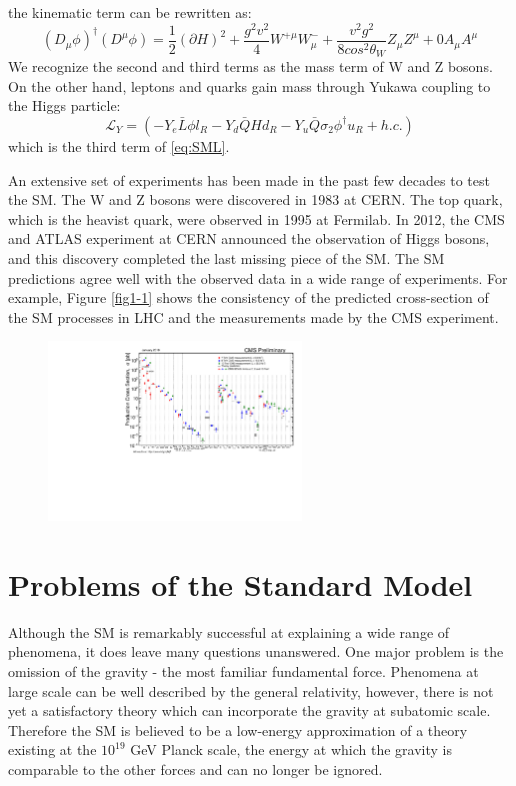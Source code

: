 \documentclass[thesis.tex]{subfiles}
\begin{document}
the kinematic term can be rewritten as:
	\begin{equation}
		(D_\mu \phi)^\dagger(D^\mu\phi) = \frac{1}{2}(\partial H)^2 + \frac{g^2v^2}{4}W^{+\mu}W_{\mu}^- + \frac{v^2g^2}{8cos^2\theta_W}Z_\mu Z^\mu + 0A_\mu A^\mu
	\end{equation}
We recognize the second and third terms as the mass term of W and Z bosons. On the other hand, leptons and quarks gain mass through Yukawa coupling to the Higgs particle:
	\begin{equation}
		\mathcal{L}_Y = (- Y_e \bar{L} \phi l_R - Y_d \bar{Q}H d_R - Y_u \bar{Q} \sigma_2 \phi^\dagger u_R + h.c.)
	\end{equation}
which is the third term of  \ref{eq:SML}. 


An extensive set of experiments has been made in the past few decades to test the SM. 
The W and Z bosons were discovered in 1983 at CERN. The top quark, which is the heavist quark, were observed in 1995 at Fermilab. 
In 2012, the CMS and ATLAS experiment at CERN announced the observation of Higgs bosons, and this discovery completed the last missing piece of the SM.  
The SM predictions agree well with the observed data in a wide range of experiments. 
For example, Figure \ref{fig1-1} shows the consistency of the predicted cross-section of the SM processes in LHC and the measurements made by the CMS experiment.
	\begin{figure}[hbtp]
		\centering
	\includegraphics[width=0.6\textwidth]{plot/SigmaNew_v0.pdf}
	\end{figure}
	

\section{Problems of the Standard Model}
Although the SM is remarkably successful at explaining a wide range of phenomena, it does leave many questions unanswered. 
One major problem is the omission of the gravity - the most familiar fundamental force. 
Phenomena at large scale can be well described by the general relativity, however, there is not yet a satisfactory theory which can incorporate the gravity at subatomic scale. 
Therefore the SM is believed to be a low-energy approximation of a theory existing at the $10^{19}$ GeV Planck scale, the energy at which the gravity is comparable to the other forces and can no longer be ignored.
\end{document}
